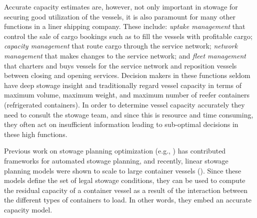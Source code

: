 Accurate capacity estimates are, however, not only important in stowage 
for securing good utilization of the vessels,
it is also paramount for many other functions in a liner shipping company. These include: {\em uptake management} that control the sale of cargo bookings such as to fill the vessels with profitable cargo; {\em capacity management} that route cargo through the service network; {\em network management} that makes changes to the service network; and {\em fleet management} that charters and buys vessels for the service network and reposition vessels between closing and opening services.  
%
Decision makers in these functions seldom have deep stowage insight and traditionally regard vessel capacity in terms of maximum volume, maximum weight, and maximum number of reefer containers (refrigerated containers). In order to determine vessel capacity accurately they need to consult the stowage team, and since this is resource and time consuming, they often act on insufficient information leading to sub-optimal decisions in these high functions.  


Previous work on stowage planning optimization (e.g., \cite{roach00,kimkang02,ambrosino04,low09,delgado09,pacino12}) has contributed frameworks for automated stowage planning, and recently, linear stowage planning models were shown to scale to large container vessels (\cite{pacino11,AlbertosThesis}). Since these models define the set of legal stowage conditions, they can be used to compute the residual capacity of a container vessel as a result of the interaction between the different types of containers to load. In other words, they embed an accurate capacity model. 

